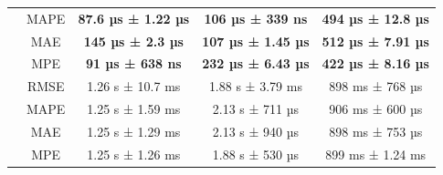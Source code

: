 \begin{table}[!htp]
\begin{tabular}{|c|c|ccc|}
        \rowcolor[HTML]{EFEFEF}
        \cellcolor[HTML]{C0C0C0}                          & MAPE                                              & \multicolumn{1}{c|}{\cellcolor[HTML]{EFEFEF}\textbf{87.6 µs ± 1.22 µs}} & \multicolumn{1}{c|}{\cellcolor[HTML]{EFEFEF}\textbf{106 µs ± 339 ns}}  & \textbf{494 µs ± 12.8 µs} \\ \cline{2-5}
        \cellcolor[HTML]{C0C0C0}                          & MAE                                               & \multicolumn{1}{c|}{\textbf{145 µs ± 2.3 µs}}                           & \multicolumn{1}{c|}{\textbf{107 µs ± 1.45 µs}}                         & \textbf{512 µs ± 7.91 µs} \\ \cline{2-5}
        \rowcolor[HTML]{EFEFEF}
        \multirow{-4}{*}{\cellcolor[HTML]{C0C0C0}ReW}     & MPE                                               & \multicolumn{1}{c|}{\cellcolor[HTML]{EFEFEF}\textbf{91 µs ± 638 ns}}    & \multicolumn{1}{c|}{\cellcolor[HTML]{EFEFEF}\textbf{232 µs ± 6.43 µs}} & \textbf{422 µs ± 8.16 µs} \\ \hline
        \cellcolor[HTML]{C0C0C0}                          & RMSE                                              & \multicolumn{1}{c|}{1.26 s ± 10.7 ms}                                   & \multicolumn{1}{c|}{1.88 s ± 3.79 ms}                                  & 898 ms ± 768 µs           \\ \cline{2-5}
        \rowcolor[HTML]{EFEFEF}
        \cellcolor[HTML]{C0C0C0}                          & MAPE                                              & \multicolumn{1}{c|}{\cellcolor[HTML]{EFEFEF}1.25 s ± 1.59 ms}           & \multicolumn{1}{c|}{\cellcolor[HTML]{EFEFEF}2.13 s ± 711 µs}           & 906 ms ± 600 µs           \\ \cline{2-5}
        \cellcolor[HTML]{C0C0C0}                          & MAE                                               & \multicolumn{1}{c|}{1.25 s ± 1.29 ms}                                   & \multicolumn{1}{c|}{2.13 s ± 940 µs}                                   & 898 ms ± 753 µs           \\ \cline{2-5}
        \rowcolor[HTML]{EFEFEF}
        \multirow{-4}{*}{\cellcolor[HTML]{C0C0C0}Prophet} & MPE                                               & \multicolumn{1}{c|}{\cellcolor[HTML]{EFEFEF}1.25 s ± 1.26 ms}           & \multicolumn{1}{c|}{\cellcolor[HTML]{EFEFEF}1.88 s ± 530 µs}           & 899 ms ± 1.24 ms          \\ \hline
    \end{tabular}
\end{table}

